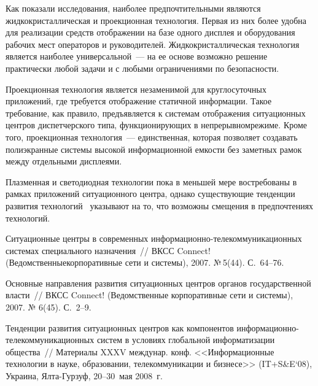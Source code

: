 \begin{multicols}{2}
     Как показали исследования, наиболее предпочтительными являются 
жидкокристаллическая и проекционная технология. Первая из них более 
удобна для реализации средств отображении на базе одного дисплея и 
оборудования рабочих мест операторов и руководителей. 
Жидкокристаллическая технология является наиболее универсальной~--- на 
ее основе возможно решение практически любой задачи и с любыми 
ограничениями по безопас\-ности. 
     
     Проекционная технология является незаменимой для круглосуточных 
приложений, где требуется отображение статичной информации. Такое 
требование, как правило, предъявляется к системам отображения 
ситуационных центров диспетчерского типа, функционирующих в 
непрерывном\linebreak режиме. Кроме того, проекционная технология~--- 
единственная, которая позволяет создавать полиэкранные системы высокой 
информационной емкости без заметных рамок между отдельными\linebreak 
дисплеями. 
     
     Плазменная и светодиодная технологии пока в меньшей мере 
востребованы в рамках приложений ситуационного центра, однако 
существующие тенденции развития технологий~\cite{17chu} указывают на 
то, что возможны смещения в предпочтениях техно\-логий. 

{\small\frenchspacing
{%
\begin{thebibliography}{99}
     
Ситу\-ационные центры в современных информа\-ци\-он\-но-те\-ле\-ком\-му\-ни\-ка\-ци\-он\-ных 
системах специального назначения~// ВКСС 
Connect! (Ведомственные\linebreak корпоративные сети и системы), 2007. №\,5(44). 
С.~64--76.

Основные направления развития ситуационных центров органов 
государственной власти~// ВКСС Connect! (Ведомственные 
корпоративные сети и системы), 2007. № 6(45). С.~2--9.

Тенденции развития ситуационных центров как компонентов 
информационно-телекоммуникационных систем в условиях глобальной 
информатизации общества~// Материалы XXXV междунар. 
конф. <<Информационные технологии в науке, образовании, 
телекоммуникации и бизнесе>> (IT\;+\;S\&E`08), Украина, Ялта-Гурзуф, 
20--30~мая 2008~г.


\end{thebibliography}}}
\end{multicols}
